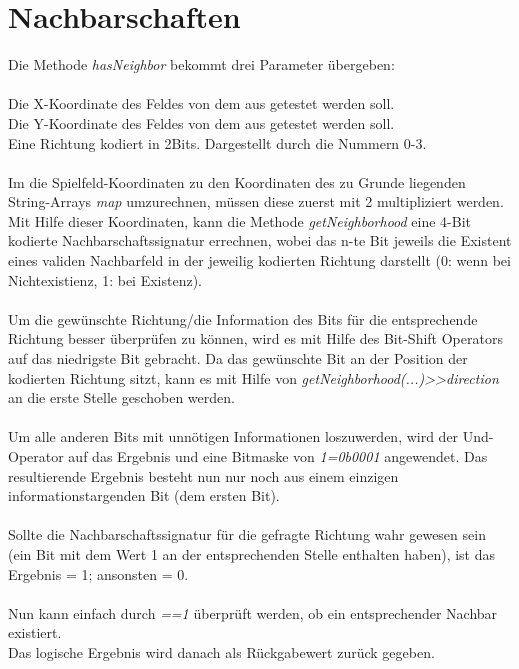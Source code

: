 \documentclass{pi1}
\begin{document}
\section{Nachbarschaften}

Die Methode \textit{hasNeighbor} bekommt drei Parameter übergeben:\\\\
 Die X-Koordinate des Feldes von dem aus getestet werden soll.\\
 Die Y-Koordinate des Feldes von dem aus getestet werden soll.\\
 Eine Richtung kodiert in 2Bits. Dargestellt durch die Nummern 0-3.\\\\
Im die Spielfeld-Koordinaten zu den Koordinaten des zu Grunde liegenden String-Arrays \textit{map} umzurechnen, müssen diese zuerst mit 2 multipliziert werden.\\
Mit Hilfe dieser Koordinaten, kann die Methode \textit{getNeighborhood} eine 4-Bit kodierte Nachbarschaftssignatur errechnen, wobei das n-te Bit jeweils die Existent eines validen Nachbarfeld in der jeweilig kodierten Richtung darstellt (0: wenn bei Nichtexistienz, 1: bei Existenz).\\\\
Um die gewünschte Richtung/die Information des Bits für die entsprechende Richtung besser überprüfen zu können, wird es mit Hilfe des Bit-Shift Operators auf das niedrigste Bit gebracht. Da das gewünschte Bit an der Position der kodierten Richtung sitzt, kann es mit Hilfe von \textit{getNeighborhood(...)>>direction} an die erste Stelle geschoben werden.\\\\
Um alle anderen Bits mit unnötigen Informationen loszuwerden, wird der \glqq Und\grqq -Operator auf das Ergebnis und eine Bitmaske von \textit{1=0b0001} angewendet. Das resultierende Ergebnis besteht nun nur noch aus einem einzigen informationstargenden Bit (dem ersten Bit).\\\\
Sollte die Nachbarschaftssignatur für die gefragte Richtung wahr gewesen sein (ein Bit mit dem Wert 1 an der entsprechenden Stelle enthalten haben), ist das Ergebnis = 1; ansonsten = 0.\\\\
Nun kann einfach durch \textit{==1} überprüft werden, ob ein entsprechender Nachbar existiert.\\
Das logische Ergebnis wird danach als Rückgabewert zurück gegeben.\\\\
\end{document}
